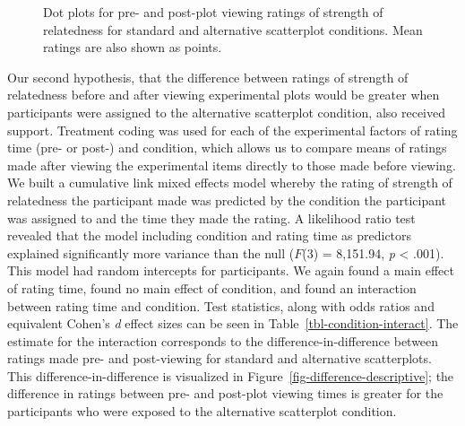 \documentclass[sigconf]{acmart}
\begin{document}
\begin{figure}


\caption{\label{fig-descriptives}Dot plots for pre- and post-plot
viewing ratings of strength of relatedness for standard and alternative
scatterplot conditions. Mean ratings are also shown as points.}

\end{figure}%

Our second hypothesis, that the difference between ratings of strength
of relatedness before and after viewing experimental plots would be
greater when participants were assigned to the alternative scatterplot
condition, also received support. Treatment coding was used for each of
the experimental factors of rating time (pre- or post-) and condition,
which allows us to compare means of ratings made after viewing the
experimental items directly to those made before viewing. We built a
cumulative link mixed effects model whereby the rating of strength of
relatedness the participant made was predicted by the condition the
participant was assigned to and the time they made the rating. A
likelihood ratio test revealed that the model including condition and
rating time as predictors explained significantly more variance than the
null (\(F\)(3) = 8,151.94, \emph{p} \textless{} .001). This model had
random intercepts for participants. We again found a main effect of
rating time, found no main effect of condition, and found an interaction
between rating time and condition. Test statistics, along with odds
ratios and equivalent Cohen's \emph{d} effect sizes can be seen in
Table~\ref{tbl-condition-interact}. The estimate for the interaction
corresponds to the difference-in-difference between ratings made pre-
and post-viewing for standard and alternative scatterplots. This
difference-in-difference is visualized in
Figure~\ref{fig-difference-descriptive}; the difference in ratings
between pre- and post-plot viewing times is greater for the participants
who were exposed to the alternative scatterplot condition.
\end{document}
